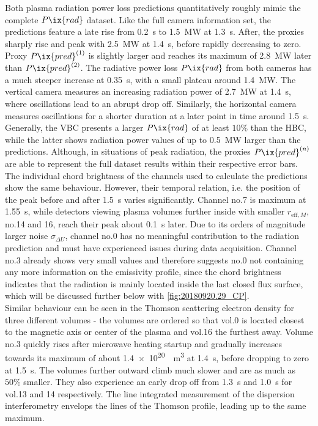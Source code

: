             Both plasma radiation power loss predictions quantitatively roughly mimic the complete $P\ix{rad}$ dataset. Like the full camera information set, the predictions feature a late rise from \SI{0.2}{\second} to \SI{1.5}{\mega\watt} at \SI{1.3}{\second}. After, the proxies sharply rise and peak with \SI{2.5}{\mega\watt} at \SI{1.4}{\second}, before rapidly decreasing to zero. Proxy $P\ix{pred}^{\left(1\right)}$ is slightly larger and reaches its maximum of \SI{2.8}{\mega\watt} later than $P\ix{pred}^{\left(2\right)}$. The radiative power loss $P\ix{rad}$ from both cameras has a much steeper increase at \SI{0.35}{\second}, with a small plateau around \SI{1.4}{\mega\watt}. The vertical camera measures an increasing radiation power of \SI{2.7}{\mega\watt} at \SI{1.4}{\second}, where oscillations lead to an abrupt drop off. Similarly, the horizontal camera measures oscillations for a shorter duration at a later point in time around \SI{1.5}{\second}. Generally, the VBC presents a larger $P\ix{rad}$ of at least $10\%$ than the HBC, while the latter shows radiation power values of up to \SI{0.5}{\mega\watt} larger than the predictions. Although, in situations of peak radiation, the proxies $P\ix{pred}^{\left(n\right)}$ are able to represent the full dataset results within their respective error bars.\\%
            The individual chord brightness of the channels used to calculate the predictions show the same behaviour. However, their temporal relation, i.e. the position of the peak before and after \SI{1.5}{\second} varies significantly. Channel no.7 is maximum at \SI{1.55}{\second}, while detectors viewing plasma volumes further inside with smaller $r_{\text{eff}, M}$, no.14 and 16, reach their peak about \SI{0.1}{\second} later. Due to its orders of magnitude larger noise $\sigma_{\Delta U}$, channel no.0 has no meaningful contribution to the radiation prediction and must have experienced issues during data acquisition. Channel no.3 already shows very small values and therefore suggests no.0 not containing any more information on the emissivity profile, since the chord brightness indicates that the radiation is mainly located inside the last closed flux surface, which will be discussed further below with \cref{fig:20180920.29_CP}.\\%
            Similar behaviour can be seen in the Thomson scattering electron density for three different volumes - the volumes are ordered so that vol.0 is located closest to the magnetic axis or center of the plasma and vol.16 the furthest away. Volume no.3 quickly rises after microwave heating startup and gradually increases towards its maximum of about \SI{1.4e20}{\per\cubic\meter} at \SI{1.4}{\second}, before dropping to zero at \SI{1.5}{\second}. The volumes further outward climb much slower and are as much as $50\%$ smaller. They also experience an early drop off from \SI{1.3}{\second} and \SI{1.0}{\second} for vol.13 and 14 respectively. The line integrated measurement of the dispersion interferometry envelops the lines of the Thomson profile, leading up to the same maximum.\\%
